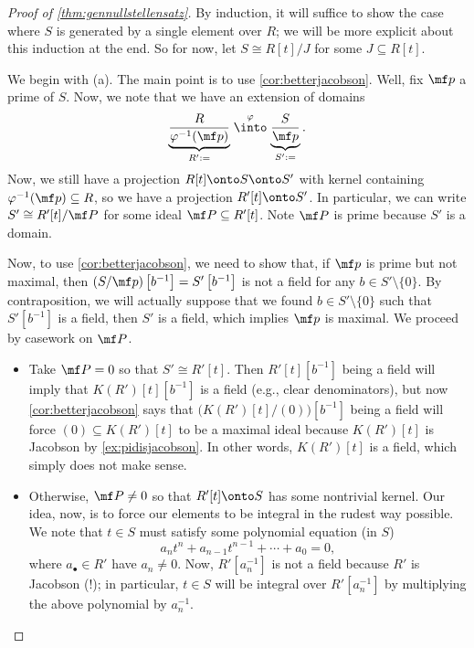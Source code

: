 \begin{proof}[Proof of \autoref{thm:gennullstellensatz}]
	By induction, it will suffice to show the case where $S$ is generated by a single element over $R$; we will be more explicit about this induction at the end.
	So for now, let $S\cong R[t]/J$ for some $J\subseteq R[t]$.

	We begin with (a). The main point is to use \autoref{cor:betterjacobson}. Well, fix $\mf p$ a prime of $S$. Now, we note that we have an extension of domains
	\[\underbrace{\frac R{\varphi^{-1}(\mf p)}}_{R':=}\stackrel\varphi\into\underbrace{\frac S{\mf p}}_{S':=}.\]
	Now, we still have a projection $R[t]\onto S\onto S'$ with kernel containing $\varphi^{-1}(\mf p)\subseteq R$, so we have a projection $R'[t]\onto S'$. In particular, we can write $S'\cong R'[t]/\mf P$ for some ideal $\mf P\subseteq R'[t]$. Note $\mf P$ is prime because $S'$ is a domain.
	
	Now, to use \autoref{cor:betterjacobson}, we need to show that, if $\mf p$ is prime but not maximal, then $(S/\mf p)\left[b^{-1}\right]=S'\left[b^{-1}\right]$ is not a field for any $b\in S'\setminus\{0\}$. By contraposition, we will actually suppose that we found $b\in S'\setminus\{0\}$ such that $S'\left[b^{-1}\right]$ is a field, then $S'$ is a field, which implies $\mf p$ is maximal. We proceed by casework on $\mf P$.
	\begin{itemize}
		\item Take $\mf P=0$ so that $S'\cong R'[t]$. Then $R'[t]\left[b^{-1}\right]$ being a field will imply that $K(R')[t]\left[b^{-1}\right]$ is a field (e.g., clear denominators), but now \autoref{cor:betterjacobson} says that $\big(K(R')[t]/(0)\big)\left[b^{-1}\right]$ being a field will force $(0)\subseteq K(R')[t]$ to be a maximal ideal because $K(R')[t]$ is Jacobson by \autoref{ex:pidisjacobson}. In other words, $K(R')[t]$ is a field, which simply does not make sense.\todo{}

		\item Otherwise, $\mf P\ne0$ so that $R'[t]\onto S$ has some nontrivial kernel. Our idea, now, is to force our elements to be integral in the rudest way possible. We note that $t\in S$ must satisfy some polynomial equation (in $S$)
		\[a_nt^n+a_{n-1}t^{n-1}+\cdots+a_0=0,\]
		where $a_\bullet\in R'$ have $a_n\ne0$. Now, $R'\left[a_n^{-1}\right]$ is not a field because $R'$ is Jacobson (!); in particular, $t\in S$ will be integral over $R'\left[a_n^{-1}\right]$ by multiplying the above polynomial by $a_n^{-1}$.
		

\end{itemize}
\end{proof}
